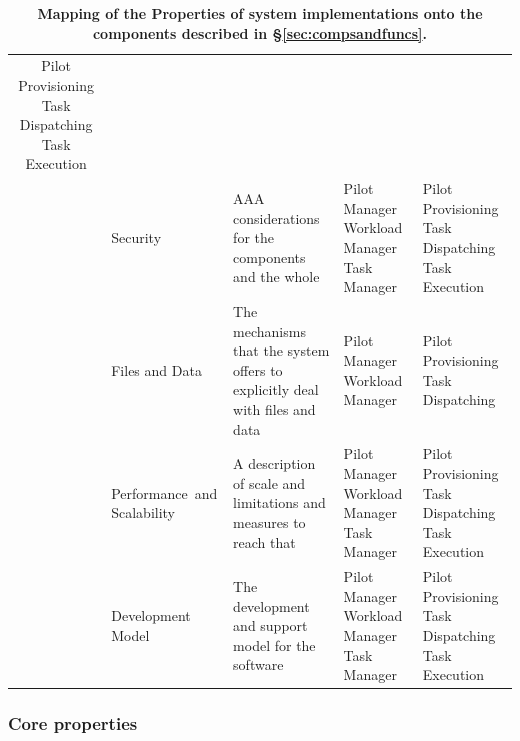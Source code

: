 \documentclass{sig-alternate}
\begin{document}
\begin{table}
\begin{tabular}{c|p{3.6cm}|p{5cm}|p{2.7cm}|p{2.7cm}|}
Pilot Provisioning \newline
  Task Dispatching \newline
  Task Execution \\
\cline{2-5}
                                     &
Security                             &
AAA considerations for the components and the whole &
Pilot Manager      \newline
  Workload Manager \newline
  Task Manager                       &
Pilot Provisioning \newline
  Task Dispatching \newline
  Task Execution \\
\cline{2-5}
                                     &
Files and Data                       &
The mechanisms that the system offers to explicitly deal with files and data &
Pilot Manager      \newline
   Workload Manager                  &
Pilot Provisioning \newline
  Task Dispatching \\
\cline{2-5}
                                     &
Performance~and    \newline
  Scalability                        &
A description of scale and limitations and measures to reach that &
Pilot Manager      \newline
  Workload Manager \newline
  Task Manager                       &
Pilot Provisioning \newline
  Task Dispatching \newline
  Task Execution \\
\cline{2-5}
                                     &
Development Model                    &
The development and support model for the software &
Pilot Manager      \newline
  Workload Manager \newline
  Task Manager                       &
Pilot Provisioning \newline
  Task Dispatching \newline
  Task Execution \\
\hline
\end{tabular}
\caption{\textbf{Mapping of the Properties of \pilot system implementations
onto the components described in \S\ref{sec:compsandfuncs}.}}
\label{table:property_component_mapping}
\end{table}

\subsubsection{Core properties}
\label{sec:coreprops}
\end{document}
